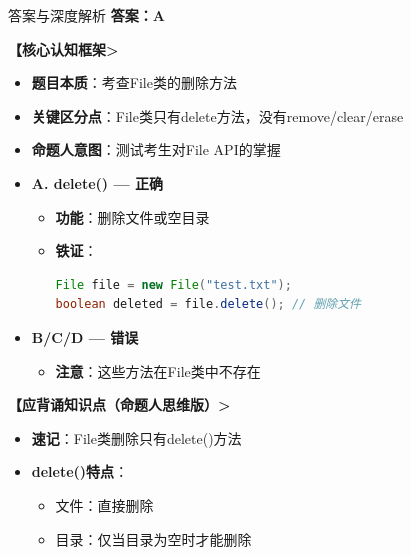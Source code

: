 \documentclass[12pt, a4paper]{ctexart}
\begin{document}
\begin{bluebox}{答案与深度解析}
	\textbf{答案：A}

	\textbf{【核心认知框架>}
	\begin{itemize}[label={}, leftmargin=*, nosep]
		\item \textbf{题目本质}：考查File类的删除方法
		\item \textbf{关键区分点}：File类只有delete方法，没有remove/clear/erase
		\item \textbf{命题人意图}：测试考生对File API的掌握
	\end{itemize}

	\begin{itemize}[label={}, nosep]
		\item \textbf{A. delete() — 正确}
		\begin{itemize}[label={}, leftmargin=*, nosep]
			\item \textbf{功能}：删除文件或空目录
			\item \textbf{铁证}：
			      \begin{lstlisting}[language=Java]
File file = new File("test.txt");
boolean deleted = file.delete(); // 删除文件
      \end{lstlisting}
		\end{itemize}

		\item \textbf{B/C/D — 错误}
		\begin{itemize}[label={}, leftmargin=*, nosep]
			\item \textbf{注意}：这些方法在File类中不存在
		\end{itemize}
	\end{itemize}

	\textbf{【应背诵知识点（命题人思维版）>}
	\begin{itemize}[label={}, nosep]
		\item \textbf{速记}：File类删除只有delete()方法

		\item \textbf{delete()特点}：
		      \begin{itemize}[label={}, nosep]
			      \item 文件：直接删除
			      \item 目录：仅当目录为空时才能删除
		      \end{itemize}
	\end{itemize}
\end{bluebox}
\end{document}
